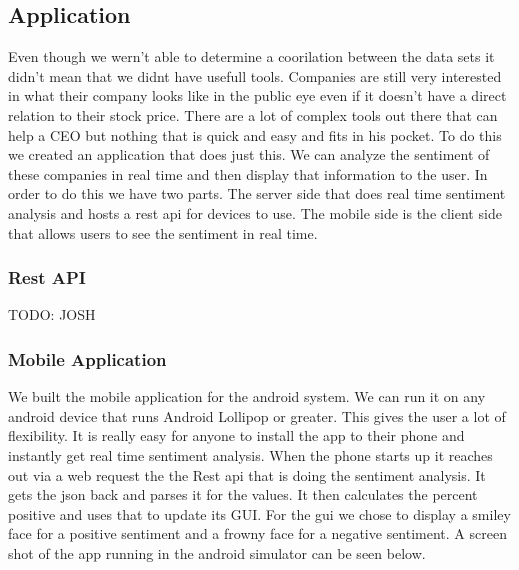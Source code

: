\documentclass{acm_proc_article-sp}
\begin{document}
\begin{doublespace}
\subsection{Application}

Even though we wern't able to determine a coorilation between the data sets it
didn't mean that we didnt have usefull tools. Companies are still very
interested in what their company looks like in the public eye even if it
doesn't have a direct relation to their stock price. There are a lot of complex
tools out there that can help a CEO but nothing that is quick and easy and fits
in his pocket. To do this we created an application that does just this. We can
analyze the sentiment of these companies in real time and then display that
information to the user. In order to do this we have two parts. The server side
that does real time sentiment analysis and hosts a rest api for devices to use.
The mobile side is the client side that allows users to see the sentiment in
real time.

\subsubsection{Rest API}
TODO: JOSH

\subsubsection{Mobile Application}

We built the mobile application for the android system. We can run it on any
android device that runs Android Lollipop or greater. This gives the user a lot
of flexibility. It is really easy for anyone to install the app to their phone
and instantly get real time sentiment analysis. When the phone starts up it
reaches out via a web request the the Rest api that is doing the sentiment
analysis. It gets the json back and parses it for the values. It then
calculates the percent positive and uses that to update its GUI. For the gui we
chose to display a smiley face for a positive sentiment and a frowny face for a
negative sentiment. A screen shot of the app running in the android simulator
can be seen below.  

\break


\end{doublespace}
\end{document}
